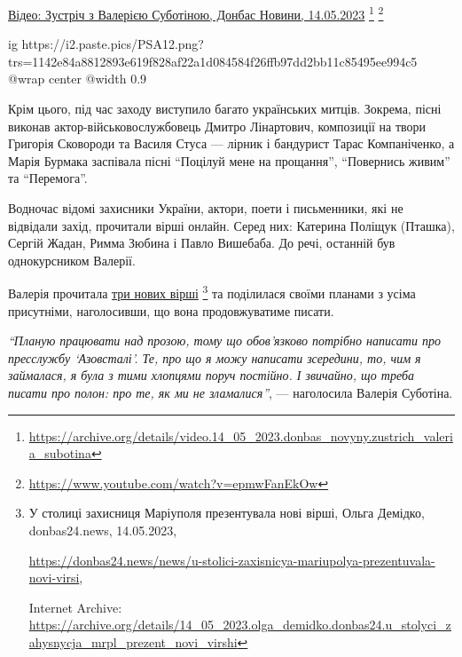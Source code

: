 \href{https://archive.org/details/video.14_05_2023.donbas_novyny.zustrich_valeria_subotina}{%
Відео: Зустріч з Валерією Суботіною, Донбас Новини, 14.05.2023}%
\footnote{\url{https://archive.org/details/video.14_05_2023.donbas_novyny.zustrich_valeria_subotina}} %
\footnote{\url{https://www.youtube.com/watch?v=epmwFanEkOw}}

\ifcmt
  ig https://i2.paste.pics/PSA12.png?trs=1142e84a8812893e619f828af22a1d084584f26ffb97dd2bb11c85495ee994c5
  @wrap center
  @width 0.9
\fi

Крім цього, під час заходу виступило багато українських митців. Зокрема, пісні
виконав актор-військовослужбовець Дмитро Лінартович, композиції на твори
Григорія Сковороди та Василя Стуса — лірник і бандурист Тарас Компаніченко, а
Марія Бурмака заспівала пісні \enquote{Поцілуй мене на прощання}, \enquote{Повернись живим} та
\enquote{Перемога}.


Водночас відомі захисники України, актори, поети і письменники, які не
відвідали захід, прочитали вірші онлайн. Серед них: Катерина Поліщук (Пташка),
Сергій Жадан, Римма Зюбина і Павло Вишебаба. До речі, останній був
однокурсником Валерії.


Валерія прочитала \href{https://archive.org/details/14_05_2023.olga_demidko.donbas24.u_stolyci_zahysnycja_mrpl_prezent_novi_virshi}{три нових вірші}%
\footnote{У столиці захисниця Маріуполя презентувала нові вірші, Ольга Демідко, donbas24.news, 14.05.2023, \par%
\url{https://donbas24.news/news/u-stolici-zaxisnicya-mariupolya-prezentuvala-novi-virsi}, \par%
Internet Archive: \url{https://archive.org/details/14_05_2023.olga_demidko.donbas24.u_stolyci_zahysnycja_mrpl_prezent_novi_virshi}%
} та поділилася своїми планами з усіма
присутніми, наголосивши, що вона продовжуватиме писати.

\begin{leftbar}
\emph{\enquote{Планую працювати над прозою, тому що обов'язково потрібно написати про
пресслужбу \enquote{Азовсталі}. Те, про що я можу написати зсередини, то, чим я
займалася, я була з тими хлопцями поруч постійно. І звичайно, що треба писати
про полон: про те, як ми не зламалися}}, — наголосила Валерія Суботіна.
\end{leftbar}

